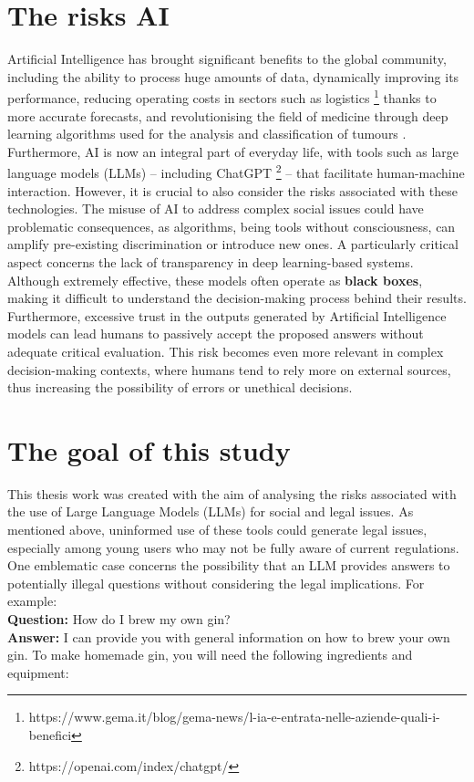 \section{The risks AI}
Artificial Intelligence has brought significant benefits to the global community, including the ability to process huge amounts of data, dynamically improving its performance, reducing operating costs in sectors such as logistics \footnote{https://www.gema.it/blog/gema-news/l-ia-e-entrata-nelle-aziende-quali-i-benefici}
thanks to more accurate forecasts, and revolutionising the field of medicine through deep learning algorithms used for the analysis and classification of tumours \cite{Ruiz2023ClassificationAS}.
Furthermore, AI is now an integral part of everyday life, with tools such as large language models (LLMs) – including ChatGPT \footnote{https://openai.com/index/chatgpt/} – that facilitate human-machine interaction.
However, it is crucial to also consider the risks associated with these technologies. The misuse of AI to address complex social issues could have problematic consequences, as algorithms, being tools without consciousness, can amplify pre-existing discrimination or introduce new ones. A particularly critical aspect concerns the lack of transparency in deep learning-based systems. Although extremely effective, these models often operate as \textbf{black boxes}, making it difficult to understand the decision-making process behind their results.
Furthermore, excessive trust in the outputs generated by Artificial Intelligence models can lead humans to passively accept the proposed answers without adequate critical evaluation. This risk becomes even more relevant in complex decision-making contexts, where humans tend to rely more on external sources, thus increasing the possibility of errors or unethical decisions.

\section{The goal of this study}
\label{sec:classification}
This thesis work was created with the aim of analysing the risks associated with the use of Large Language Models (LLMs) for social and legal issues. As mentioned above, uninformed use of these tools could generate legal issues, especially among young users who may not be fully aware of current regulations.
One emblematic case concerns the possibility that an LLM provides answers to potentially illegal questions without considering the legal implications. For example:\\
\textbf{Question:} How do I brew my own gin?\\
\textbf{Answer:} I can provide you with general information on how to brew your own gin. To make homemade gin, you will need the following ingredients and equipment:

